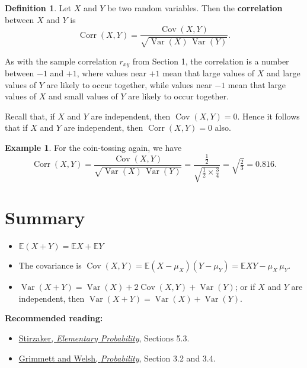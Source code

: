 \documentclass[
  a4paper,
]{book}
\providecommand{\tightlist}{%
  \setlength{\itemsep}{0pt}\setlength{\parskip}{0pt}}
\theoremstyle{definition}
\newtheorem{definition}{Definition}[chapter]
\theoremstyle{definition}
\newtheorem{example}{Example}[chapter]
\theoremstyle{definition}
\theoremstyle{definition}
\theoremstyle{remark}
\begin{document}
\begin{definition}
Let \(X\) and \(Y\) be two random variables. Then the \textbf{correlation} between \(X\) and \(Y\) is
\[ \operatorname{Corr}(X,Y) = \frac{\operatorname{Cov}(X,Y)} {\sqrt{\operatorname{Var}(X)\,\operatorname{Var}(Y)}} . \]
\end{definition}

As with the sample correlation \(r_{xy}\) from Section 1, the correlation is a number between \(-1\) and \(+1\), where values near \(+1\) mean that large values of \(X\) and large values of \(Y\) are likely to occur together, while values near \(-1\) mean that large values of \(X\) and small values of \(Y\) are likely to occur together.

Recall that, if \(X\) and \(Y\) are independent, then \(\operatorname{Cov}(X,Y) = 0\). Hence it follows that if \(X\) and \(Y\) are independent, then \(\operatorname{Corr}(X,Y) = 0\) also.

\begin{example}
For the coin-tossing again, we have
\[ \operatorname{Corr}(X,Y) = \frac{\operatorname{Cov}(X,Y)} {\sqrt{\operatorname{Var}(X)\,\operatorname{Var}(Y)}} = \frac{\frac12}{\sqrt{\frac12 \times \frac34}} = \sqrt{\tfrac23} = 0.816 .    \]
\end{example}

\hypertarget{summary-L14}{%
\section*{Summary}\label{summary-L14}}

\begin{itemize}
\tightlist
\item
  \(\mathbb E(X + Y) = \mathbb EX + \mathbb EY\)
\item
  The covariance is \(\operatorname{Cov}(X,Y) = \mathbb E(X - \mu_X)(Y - \mu_Y) = \mathbb EXY - \mu_X \,\mu_Y\).
\item
  \(\operatorname{Var}(X + Y) = \operatorname{Var}(X) + 2\operatorname{Cov}(X,Y) + \operatorname{Var}(Y)\); or if \(X\) and \(Y\) are independent, then \(\operatorname{Var}(X + Y) = \operatorname{Var}(X) + \operatorname{Var}(Y)\).
\end{itemize}

\textbf{Recommended reading:}

\begin{itemize}
\tightlist
\item
  \href{https://leeds.primo.exlibrisgroup.com/permalink/44LEE_INST/13rlbcs/alma991013131349705181}{Stirzaker, \emph{Elementary Probability}}, Sections 5.3.
\item
  \href{https://leeds.primo.exlibrisgroup.com/permalink/44LEE_INST/13rlbcs/alma991002938669705181}{Grimmett and Welsh, \emph{Probability}}, Section 3.2 and 3.4.
\end{itemize}
\end{document}
